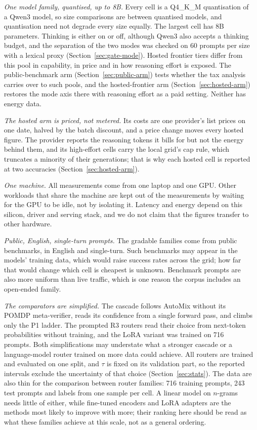 \emph{One model family, quantised, up to 8B.} Every cell is a Q4\_K\_M
quantisation of a Qwen3 model, so size comparisons are between quantised
models, and quantisation need not degrade every size equally. The largest
cell has 8B parameters. Thinking is either on or off, although Qwen3 also
accepts a thinking budget, and the separation of the two modes was checked
on 60 prompts per size with a lexical proxy
(Section~\ref{sec:gate-mode}). Hosted frontier tiers differ from this pool
in capability, in price and in how reasoning effort is exposed. The
public-benchmark arm (Section~\ref{sec:public-arm}) tests whether the tax
analysis carries over to such pools, and the hosted-frontier arm
(Section~\ref{sec:hosted-arm}) restores the mode axis there with reasoning
effort as a paid setting. Neither has energy data.

\emph{The hosted arm is priced, not metered.} Its costs are one provider's
list prices on one date, halved by the batch discount, and a price change
moves every hosted figure. The provider reports the reasoning tokens it
bills for but not the energy behind them, and its high-effort cells carry
the local grid's cap rule, which truncates a minority of their generations;
that is why each hosted cell is reported at two accuracies
(Section~\ref{sec:hosted-arm}).

\emph{One machine.} All measurements come from one laptop and one GPU.
Other workloads that share the machine are kept out of the measurements by
waiting for the GPU to be idle, not by isolating it. Latency and energy
depend on this silicon, driver and serving stack, and we do not claim that
the figures transfer to other hardware.

\emph{Public, English, single-turn prompts.} The gradable families come from
public benchmarks, in English and single-turn. Such benchmarks may appear
in the models' training data, which would raise success rates across the
grid; how far that would change which cell is cheapest is unknown.
Benchmark prompts are also more uniform than live traffic, which is one
reason the corpus includes an open-ended family.

\emph{The comparators are simplified.} The cascade follows AutoMix without
its POMDP meta-verifier, reads its confidence from a single forward pass,
and climbs only the P1 ladder. The prompted R3 routers read their choice from
next-token probabilities without training, and the LoRA variant was trained
on 716 prompts. Both simplifications may understate what a stronger cascade
or a language-model router trained on more data could achieve. All routers are trained and evaluated on one split, and $\tau$ is
fixed on its validation part, so the reported intervals exclude the
uncertainty of that choice (Section~\ref{sec:stats}). The data are also thin
for the comparison between router families: 716 training prompts, 243 test
prompts and labels from one sample per cell. A linear model on $n$-grams
needs little of either, while fine-tuned encoders and LoRA adapters are the
methods most likely to improve with more; their ranking here should be read
as what these families achieve at this scale, not as a general ordering.

